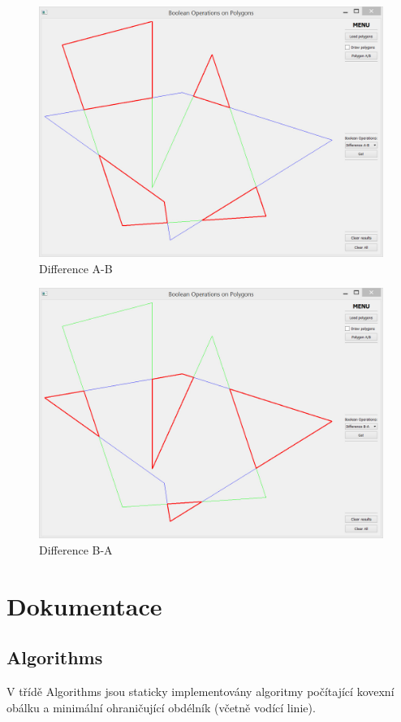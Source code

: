 \documentclass[a4paper, 12pt]{article}
\begin{document}
\begin{figure}[h]
	\centering
	\includegraphics[width=12cm]{A-B.jpg}
	\caption{Difference A-B}
\end{figure}


\begin{figure}[h]
	\centering
	\includegraphics[width=12cm]{B-A.jpg}
	\caption{Difference B-A}
\end{figure}


\clearpage



\section{Dokumentace}

\subsection{Algorithms}
V třídě Algorithms jsou staticky implementovány algoritmy počítající kovexní obálku a minimální ohraničující obdélník (včetně vodící linie).
\end{document}
